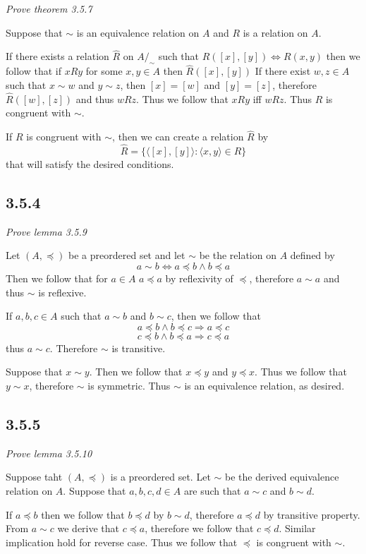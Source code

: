 \documentclass[11pt,oneside,titlepage]{book}
\DeclareMathOperator \ra {\Rightarrow}
\newcommand{\eangle}[1]{\langle #1 \rangle}
\begin{document}
\textit{Prove theorem 3.5.7}

Suppose that $\sim$ is an equivalence relation on $A$ and $R$ is a relation on $A$.

If there exists a relation $\hat{R}$ on $A/_\sim$ such that
$\hat{R}([x], [y]) \iff R(x, y)$
then we follow that if  $xRy$ for some $x, y \in A$ then $\hat{R}([x], [y])$
If there exist $w, z \in A$ such that
$x \sim w$ and $y \sim z$, then $[x] = [w]$ and $[y] = [z]$, therefore $\hat{R}([w], [z])$
and thus $wRz$. Thus we follow that $xRy$ iff $wRz$. Thus $R$ is congruent with $\sim$.

If $R$ is congruent with $\sim$, then we can create a relation $\hat{R}$ by
$$\hat{R} = \{\eangle{[x], [y]} : \eangle{x, y} \in R\}$$
that will satisfy the desired conditions.

\subsection*{3.5.4}

\textit{Prove lemma 3.5.9}

Let $(A, \preceq)$ be a preordered set and let $\sim$ be the relation on $A$ defined by
$$a \sim b \iff a \preceq b \land b \preceq a$$
Then we follow that for $a \in A$ $a \preceq a$ by reflexivity of $\preceq$, therefore
$a \sim a$ and thus $\sim$ is reflexive.

If $a, b, c \in A$ such that $a \sim b$ and $b \sim c$, then we follow that
$$a \preceq b \land b \preceq c \ra a \preceq c$$
$$c \preceq b \land b \preceq a \ra c \preceq a$$
thus $a \sim c$. Therefore $\sim$ is transitive.

Suppose that $x \sim y$. Then we follow that $x \preceq y $ and $y \preceq x$. Thus we follow that
$y \sim x$, therefore $\sim$ is symmetric. Thus $\sim$ is an equivalence relation, as desired.

\subsection*{3.5.5}

\textit{Prove lemma 3.5.10}

Suppose taht $(A, \preceq)$ is a preordered set. Let $\sim$ be the derived equivalence
relation on $A$. Suppose that $a, b, c, d \in A$ are such that $a \sim c$ and $b \sim d$.

If $a \preceq b$ then we follow that $b \preceq d$ by $b \sim d$, therefore $a \preceq d$
by transitive property. From $a \sim c$ we derive that $c \preceq a$, therefore we
follow that $c \preceq d$. Similar implication hold for reverse case. Thus we follow that
$\preceq$ is congruent with $\sim$.
\end{document}
